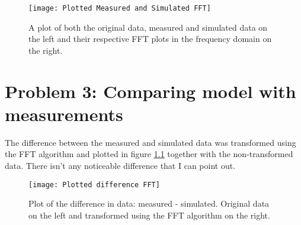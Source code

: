 \documentclass[%
oneside,    %
project,    %
nosummary   %
]{USN-MSc}
\begin{document}
\begin{figure}[!ht]
  \centering
  \texttt{[image: Plotted Measured and Simulated FFT]}
  \caption{
  A plot of both the original data, measured and simulated data on the left and their respective FFT plots in the frequency domain on the right.}
  \label{fig:plot_meas_and_sim_fft}
\end{figure}

\chapter{Problem 3: Comparing model with measurements}
\label{ch:comparison}
The difference between the measured and simulated data was transformed using the FFT algorithm and plotted in figure \ref{fig:plot_diff_fft} together with the non-transformed data. There isn't any noticeable difference that I can point out.

\begin{figure}[!ht]
  \centering
  \texttt{[image: Plotted difference FFT]}
  \caption{
  Plot of the difference in data: measured - simulated. Original data on the left and transformed using the FFT algorithm on the right.}
  \label{fig:plot_diff_fft}
\end{figure}

~\nocite{*}

\cleardoublepage

\printbibliography[heading=bibintoc, title={References}]
\end{document}

